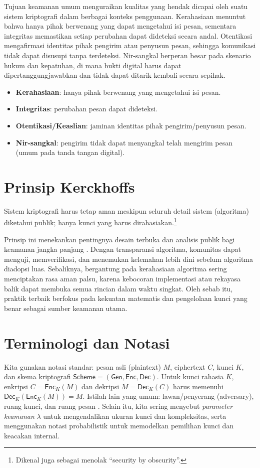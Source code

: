 \documentclass[../main.tex]{subfiles}
\begin{document}
Tujuan keamanan umum menguraikan kualitas yang hendak dicapai oleh suatu sistem kriptografi dalam berbagai konteks penggunaan. Kerahasiaan menuntut bahwa hanya pihak berwenang yang dapat mengetahui isi pesan, sementara integritas memastikan setiap perubahan dapat dideteksi secara andal. Otentikasi mengafirmasi identitas pihak pengirim atau penyusun pesan, sehingga komunikasi tidak dapat disusupi tanpa terdeteksi. Nir-sangkal berperan besar pada skenario hukum dan kepatuhan, di mana bukti digital harus dapat dipertanggungjawabkan dan tidak dapat ditarik kembali secara sepihak.
\begin{itemize}
  \item \textbf{Kerahasiaan}: hanya pihak berwenang yang mengetahui isi pesan.
  \item \textbf{Integritas}: perubahan pesan dapat dideteksi.
  \item \textbf{Otentikasi/Keaslian}: jaminan identitas pihak pengirim/penyusun pesan.
  \item \textbf{Nir-sangkal}: pengirim tidak dapat menyangkal telah mengirim pesan (umum pada tanda tangan digital).
\end{itemize}

\section{Prinsip Kerckhoffs}
\begin{definition}
Sistem kriptografi harus tetap aman meskipun seluruh detail sistem (algoritma) diketahui publik; hanya kunci yang harus dirahasiakan.\footnote{Dikenal juga sebagai menolak ``security by obscurity''.}
\end{definition}
Prinsip ini menekankan pentingnya desain terbuka dan analisis publik bagi keamanan jangka panjang \citep{kerckhoffs1883,katzlindell,bonehshoup}. Dengan transparansi algoritma, komunitas dapat menguji, memverifikasi, dan menemukan kelemahan lebih dini sebelum algoritma diadopsi luas. Sebaliknya, bergantung pada kerahasiaan algoritma sering menciptakan rasa aman palsu, karena kebocoran implementasi atau rekayasa balik dapat membuka semua rincian dalam waktu singkat. Oleh sebab itu, praktik terbaik berfokus pada kekuatan matematis dan pengelolaan kunci yang benar sebagai sumber keamanan utama.

\section{Terminologi dan Notasi}
Kita gunakan notasi standar: pesan asli (plaintext) \(M\), ciphertext \(C\), kunci \(K\), dan skema kriptografi \(\mathsf{Scheme}=(\mathsf{Gen},\mathsf{Enc},\mathsf{Dec})\). Untuk kunci rahasia \(K\), enkripsi \(C=\mathsf{Enc}_K(M)\) dan dekripsi \(M=\mathsf{Dec}_K(C)\) harus memenuhi \(\mathsf{Dec}_K(\mathsf{Enc}_K(M))=M\). Istilah lain yang umum: lawan/penyerang (adversary), ruang kunci, dan ruang pesan \citep{rfc4949,katzlindell}. Selain itu, kita sering menyebut \emph{parameter keamanan} \(\lambda\) untuk mengendalikan ukuran kunci dan kompleksitas, serta menggunakan notasi probabilistik untuk memodelkan pemilihan kunci dan keacakan internal.
\end{document}

